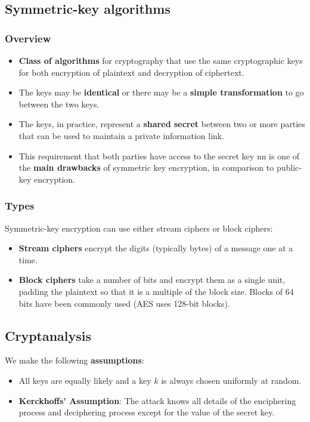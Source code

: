 
\subsection{Symmetric-key algorithms}

\subsubsection{Overview}
\begin{itemize}
\item \textbf{Class of algorithms} for cryptography that use the same
  cryptographic keys for both encryption of plaintext and decryption
  of ciphertext.
\item The keys may be \textbf{identical} or there may be a \textbf{simple
  transformation} to go between the two keys.
\item The keys, in practice, represent a \textbf{shared secret} between two or
  more parties that can be used to maintain a private information
  link.
\item This requirement that both parties have access to the secret key
nn  is one of the \textbf{main drawbacks} of symmetric key encryption, in
  comparison to public-key encryption.
\end{itemize}

\subsubsection{Types}
Symmetric-key encryption can use either stream ciphers or block ciphers:
\begin{itemize}
\item \textbf{Stream ciphers} encrypt the digits (typically bytes) of a
  message one at a time.
\item \textbf{Block ciphers} take a number of bits and encrypt them as a
  single unit, padding the plaintext so that it is a multiple of the
  block size. Blocks of 64 bits have been commonly used (AES uses
  128-bit blocks).
\end{itemize}

\subsection{Cryptanalysis}

We make the following \textbf{assumptions}:
\begin{itemize}
\item All keys are equally likely and a key $k$ is always chosen
  uniformly at random.
\item \textbf{Kerckhoffs’ Assumption}: The attack knows all details of
  the enciphering process and deciphering process except for the
  value of the secret key.
\end{itemize}

